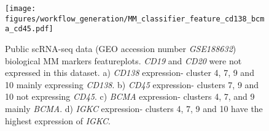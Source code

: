 \begin{figure}[htb]
\centering
\texttt{[image: figures/workflow\_generation/MM\_classifier\_feature\_cd138\_bcma\_cd45.pdf]}
\caption[Public scRNA-seq data bioligical MM markers featureplots]{Public scRNA-seq data (GEO accession number \textit{GSE188632}) biological MM markers featureplots.
\textit{CD19} and \textit{CD20} were not expressed in this dataset.
a) \textit{CD138} expression- cluster 4, 7, 9 and 10 mainly expressing \textit{CD138}.
b) \textit{CD45} expression- clusters 7, 9 and 10 not expressing \textit{CD45}.
c) \textit{BCMA} expression- clusters 4, 7, and 9 mainly \textit{BCMA}.
d) \textit{IGKC} expression- clusters 4, 7, 9 and 10 have the highest expression of \textit{IGKC}.
}
\label{fig:mm_class_ftp_cd138_cd45_bcma}
\end{figure}
%

